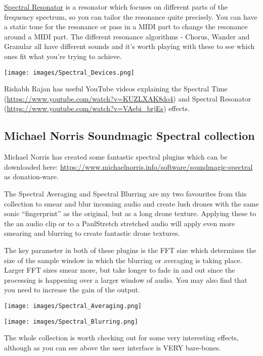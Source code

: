 \documentclass[
  12pt,
  letterpaper,
  oneside,
  open=any]{scrbook}
\begin{document}
\href{https://www.ableton.com/en/live-manual/11/live-audio-effect-reference/\#spectral-resonator}{Spectral
Resonator} is a resonator which focuses on different parts of the
frequency spectrum, so you can tailor the resonance quite precisely. You
can have a static tone for the resonance or pass in a MIDI part to
change the resonance around a MIDI part. The different resonance
algorithms - Chorus, Wander and Granular all have different sounds and
it's worth playing with these to see which ones fit what you're trying
to achieve.

\texttt{[image: images/Spectral\_Devices.png]}

Rishabh Rajan has useful YouTube videos explaining the Spectral Time
(\url{https://www.youtube.com/watch?v=KUZLXAK8do4}) and Spectral
Resonator (\url{https://www.youtube.com/watch?v=VAebi_brjEs}) effects.

\subsection{Michael Norris Soundmagic Spectral
collection}\label{michael-norris-soundmagic-spectral-collection}

Michael Norris has created some fantastic spectral plugins which can be
downloaded here:
\url{https://www.michaelnorris.info/software/soundmagic-spectral} as
donation-ware.

The Spectral Averaging and Spectral Blurring are my two favourites from
this collection to smear and blur incoming audio and create lush drones
with the same sonic ``fingerprint'' as the original, but as a long drone
texture. Applying these to the an audio clip or to a PaulStretch
stretched audio will apply even more smearing and blurring to create
fantastic drone textures.

The key parameter in both of these plugins is the FFT size which
determines the size of the sample window in which the blurring or
averaging is taking place. Larger FFT sizes smear more, but take longer
to fade in and out since the processing is happening over a larger
window of audio. You may also find that you need to increase the gain of
the output.

\texttt{[image: images/Spectral\_Averaging.png]}

\texttt{[image: images/Spectral\_Blurring.png]}

The whole collection is worth checking out for some very interesting
effects, although as you can see above the user interface is VERY
bare-bones.
\end{document}
